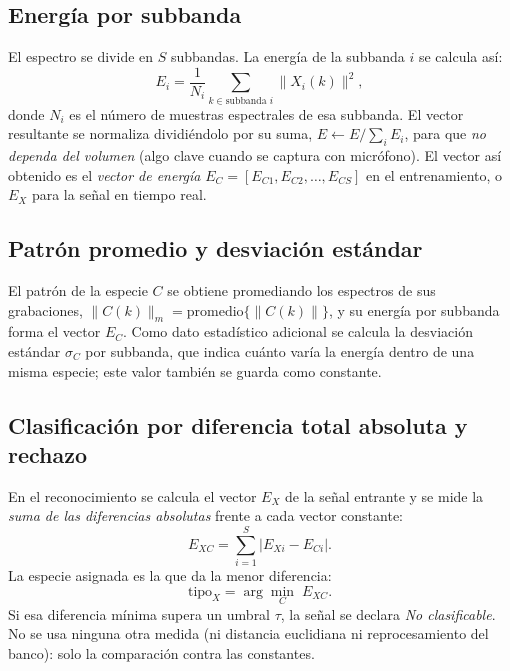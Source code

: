 \documentclass[conference]{IEEEtran}
\begin{document}
\subsection{Energía por subbanda}
El espectro se divide en $S$ subbandas. La energía de la subbanda $i$ se calcula
así:
\begin{equation}\label{eq:energia}
E_{i}=\frac{1}{N_i}\sum_{k\in \text{subbanda } i}\big\lVert X_i(k)\big\rVert^2 ,
\end{equation}
donde $N_i$ es el número de muestras espectrales de esa subbanda. El vector
resultante se normaliza dividiéndolo por su suma, $E\leftarrow E/\sum_i E_i$, para
que \emph{no dependa del volumen} (algo clave cuando se captura con micrófono). El
vector así obtenido es el \emph{vector de energía}
$E_C=[E_{C1},E_{C2},\dots,E_{CS}]$ en el entrenamiento, o $E_X$ para la señal en
tiempo real.

\subsection{Patrón promedio y desviación estándar}
El patrón de la especie $C$ se obtiene promediando los espectros de sus
grabaciones, $\lVert C(k)\rVert_m=\text{promedio}\{\lVert C(k)\rVert\}$, y su
energía por subbanda forma el vector $E_C$. Como dato estadístico adicional se
calcula la desviación estándar $\sigma_C$ por subbanda, que indica cuánto varía la
energía dentro de una misma especie; este valor también se guarda como constante.

\subsection{Clasificación por diferencia total absoluta y rechazo}
En el reconocimiento se calcula el vector $E_X$ de la señal entrante y se mide la
\emph{suma de las diferencias absolutas} frente a cada vector constante:
\begin{equation}\label{eq:dist}
E_{XC}=\sum_{i=1}^{S}\big\lvert E_{Xi}-E_{Ci}\big\rvert .
\end{equation}
La especie asignada es la que da la menor diferencia:
\begin{equation}\label{eq:argmin}
\text{tipo}_X=\arg\min_C\; E_{XC}.
\end{equation}
Si esa diferencia mínima supera un umbral $\tau$, la señal se declara
\emph{No clasificable}. No se usa ninguna otra medida (ni distancia euclidiana ni
reprocesamiento del banco): solo la comparación contra las constantes.
\end{document}

